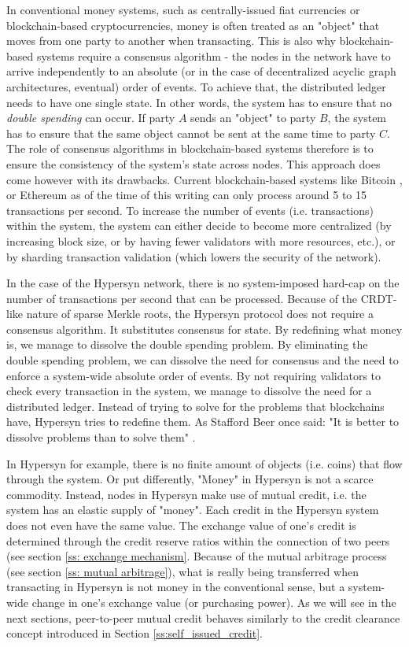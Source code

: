 \documentclass{article}
\begin{document}
In conventional money systems, such as centrally-issued fiat currencies or blockchain-based cryptocurrencies, money is often treated as an "object" that moves from one party to another when transacting. This is also why blockchain-based systems require a consensus algorithm - the nodes in the network have to arrive independently to an absolute (or in the case of decentralized acyclic graph architectures, eventual) order of events. To achieve that, the distributed ledger needs to have one single state. In other words, the system has to ensure that no \textit{double spending} can occur. If party $A$ sends an "object" to party $B$, the system has to ensure that the same object cannot be sent at the same time to party $C$. The role of consensus algorithms in blockchain-based systems therefore is to ensure the consistency of the system's state across nodes. This approach does come however with its drawbacks. Current blockchain-based systems like Bitcoin \cite{nakamoto_bitcoin_2008}, or Ethereum \cite{wood_ethereum_2013} as of the time of this writing can only process around 5 to 15 transactions per second. To increase the number of events (i.e. transactions) within the system, the system can either decide to become more centralized (by increasing block size, or by having fewer validators with more resources, etc.), or by sharding transaction validation (which lowers the security of the network). 

In the case of the Hypersyn network, there is no system-imposed hard-cap on the number of transactions per second that can be processed. Because of the CRDT-like \cite{shapiro_conict-free_2011} nature of sparse Merkle roots, the Hypersyn protocol does not require a consensus algorithm. It substitutes consensus for state. By redefining what money is, we manage to dissolve the double spending problem. By eliminating the double spending problem, we can dissolve the need for consensus and the need to enforce a system-wide absolute order of events. By not requiring validators to check every transaction in the system, we manage to dissolve the need for a distributed ledger. Instead of trying to solve for the problems that blockchains have, Hypersyn tries to redefine them. As Stafford Beer once said: "It is better to dissolve problems than to solve them" \cite{beer_designing_1994}. 

In Hypersyn for example, there is no finite amount of objects (i.e. coins) that flow through the system. Or put differently, "Money" in Hypersyn is not a scarce commodity. Instead, nodes in Hypersyn make use of mutual credit, i.e. the system has an elastic supply of "money". Each credit in the Hypersyn system does not even have the same value. The exchange value of one's credit is determined through the credit reserve ratios within the connection of two peers (see section \ref{ss: exchange mechanism}. Because of the mutual arbitrage process (see section \ref{ss: mutual arbitrage}), what is really being transferred when transacting in Hypersyn is not money in the conventional sense, but a system-wide change in one's exchange value (or purchasing power). As we will see in the next sections, peer-to-peer mutual credit behaves similarly to the credit clearance concept introduced in Section \ref{ss:self_issued_credit}.
\end{document}
